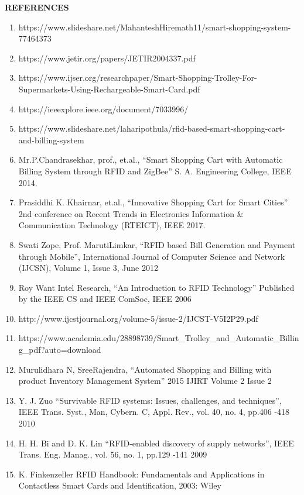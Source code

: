 \documentclass[12pt]{article}
\begin{document}
\newpage
{}
\setcounter{page}{11}
\begin{center}
\large\textbf{REFERENCES}
\end{center}
\begin{enumerate}
\item https://www.slideshare.net/MahanteshHiremath11/smart-shopping-system-77464373
\item https://www.jetir.org/papers/JETIR2004337.pdf
\item https://www.ijser.org/researchpaper/Smart-Shopping-Trolley-For-Supermarkets-Using-Rechargeable-Smart-Card.pdf
\item https://ieeexplore.ieee.org/document/7033996/
\item https://www.slideshare.net/laharipothula/rfid-based-smart-shopping-cart-and-billing-system
\item Mr.P.Chandrasekhar, prof., et.al., “Smart Shopping Cart with Automatic Billing System through RFID and ZigBee” S. A. Engineering College, IEEE 2014.
\item Prasiddhi K. Khairnar, et.al., “Innovative Shopping Cart for Smart Cities” 2nd conference on Recent Trends in Electronics Information \& Communication Technology (RTEICT), IEEE 2017. 
\item Swati Zope, Prof. MarutiLimkar, “RFID based Bill Generation and Payment through Mobile”, International Journal of Computer Science and Network (IJCSN), Volume 1, Issue 3, June 2012
\item Roy Want Intel Research, “An Introduction to RFID Technology” Published by the IEEE CS and IEEE ComSoc, IEEE 2006
\item http://www.ijcstjournal.org/volume-5/issue-2/IJCST-V5I2P29.pdf
\item https://www.academia.edu/28898739/Smart{\_}Trolley{\_}and{\_}Automatic{\_}Billing{\_}pdf?auto=download
\item Murulidhara N, SreeRajendra, “Automated Shopping and Billing with product Inventory Management System” 2015 IJIRT Volume 2 Issue 2
\item Y. J. Zuo “Survivable RFID systems: Issues, challenges, and techniques”, IEEE Trans. Syst., Man, Cybern. C, Appl. Rev., vol. 40, no. 4, pp.406 -418 2010 
\item H. H. Bi and D. K. Lin “RFID-enabled discovery of supply networks”, IEEE Trans. Eng. Manag., vol. 56, no. 1, pp.129 -141 2009 
\item K. Finkenzeller RFID Handbook: Fundamentals and Applications in Contactless Smart Cards and Identification, 2003: Wiley

\end{enumerate}
\end{document}
